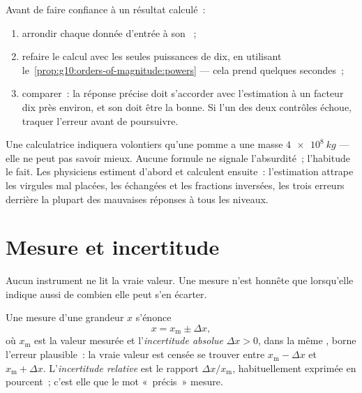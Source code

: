 \begin{method}\label{met:g10:orders-of-magnitude:sanity}
Avant de faire confiance à un résultat calculé~:
\begin{enumerate}
  \item arrondir chaque donnée d'entrée à son ~;
  \item refaire le calcul avec les seules puissances de dix, en
        utilisant le~\cref{prop:g10:orders-of-magnitude:powers} ---
        cela prend quelques secondes~;
  \item comparer~: la réponse précise doit s'accorder avec
        l'estimation à un facteur dix près environ, et son 
        doit être la bonne. Si l'un des deux contrôles échoue, traquer
        l'erreur avant de poursuivre.
\end{enumerate}
\end{method}

\begin{remark}\label{rem:g10:orders-of-magnitude:sanity}
Une calculatrice indiquera volontiers qu'une pomme a une masse
$\qty{4e8}{kg}$ --- elle ne peut pas savoir mieux. Aucune formule ne
signale l'absurdité~; l'habitude le fait. Les physiciens estiment
d'abord et calculent ensuite~: l'estimation attrape les virgules
mal placées, les  échangées et les fractions inversées, les
trois erreurs derrière la plupart des mauvaises réponses à tous les
niveaux.
\end{remark}

\section{Mesure et incertitude}

Aucun instrument ne lit la vraie valeur. Une mesure n'est honnête que
lorsqu'elle indique aussi de combien elle peut s'en écarter.

\begin{definition}\label{def:g10:orders-of-magnitude:uncertainty}
Une mesure d'une grandeur $x$ s'énonce
\[
x = x_{\text{m}} \pm \Delta x ,
\]
où $x_{\text{m}}$ est la valeur mesurée et l'\emph{incertitude
absolue} $\Delta x > 0$, dans la même
, borne l'erreur plausible~: la vraie valeur est censée
se trouver entre $x_{\text{m}} - \Delta x$ et
$x_{\text{m}} + \Delta x$. L'\emph{incertitude
relative} est le rapport
$\Delta x / x_{\text{m}}$, habituellement exprimée en pourcent~; c'est
elle que le mot «~précis~» mesure.
\end{definition}

